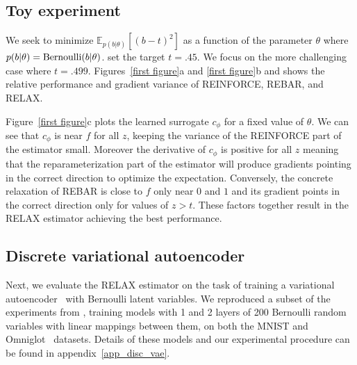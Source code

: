 \documentclass{article}
\newcommand{\RELAX}{{\textnormal{RELAX}}}
\begin{document}
\subsection{Toy experiment}
We seek to minimize $\mathbb{E}_{p(b|\theta)}[(b - t)^2]$ as a function of the parameter $\theta$ where {$p(b|\theta) = \textnormal{Bernoulli}(b|\theta)$}. \cite{tucker2017rebar} set the target $t = .45$.
We focus on the more challenging case where $t = .499$.
Figures~\ref{first figure}a and \ref{first figure}b and shows the relative performance and gradient variance of REINFORCE, REBAR, and RELAX.

Figure~\ref{first figure}c plots the learned surrogate $c_\phi$ for a fixed value of $\theta$. We can see that $c_\phi$ is near $f$ for all $z$, keeping the variance of the REINFORCE part of the estimator small. Moreover the derivative of $c_\phi$ is positive for all $z$ meaning that the reparameterization part of the estimator will produce gradients pointing in the correct direction to optimize the expectation. Conversely, the concrete relaxation of REBAR is close to $f$ only near $0$ and $1$ and its gradient points in the correct direction only for values of $z > t$. These factors together result in the RELAX estimator achieving the best performance. 


\subsection{Discrete variational autoencoder}
Next, we evaluate the \RELAX{} estimator on the task of training a variational autoencoder~\citep{kingma2013autoencoding, rezende2014stochastic} with Bernoulli latent variables.
We reproduced a subset of the experiments from \citet{tucker2017rebar}, training models with 1 and 2 layers of 200 Bernoulli random variables with linear mappings between them, on both  the MNIST and Omniglot~\citep{lake2015human} datasets.
Details of these models and our experimental procedure can be found in appendix~\ref{app_disc_vae}.

\end{document}
